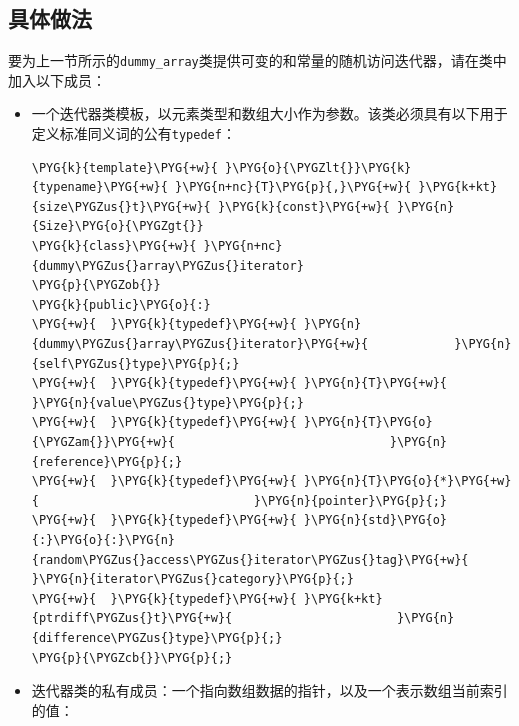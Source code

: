 
\subsection{具体做法}



要为上一节所示的\texttt{dummy\_\allowbreak{}array}类提供可变的和常量的随机访问迭代器，请在类中加入以下成员：



\begin{itemize}
\item 一个迭代器类模板，以元素类型和数组大小作为参数。该类必须具有以下用于定义标准同义词的公有\texttt{typedef}：



\begin{codeblockbg}
\begin{Verbatim}[commandchars=\\\{\},breaklines=true,breakanywhere=true,fontsize=\codefont,xleftmargin=17bp]
\PYG{k}{template}\PYG{+w}{ }\PYG{o}{\PYGZlt{}}\PYG{k}{typename}\PYG{+w}{ }\PYG{n+nc}{T}\PYG{p}{,}\PYG{+w}{ }\PYG{k+kt}{size\PYGZus{}t}\PYG{+w}{ }\PYG{k}{const}\PYG{+w}{ }\PYG{n}{Size}\PYG{o}{\PYGZgt{}}
\PYG{k}{class}\PYG{+w}{ }\PYG{n+nc}{dummy\PYGZus{}array\PYGZus{}iterator}
\PYG{p}{\PYGZob{}}
\PYG{k}{public}\PYG{o}{:}
\PYG{+w}{  }\PYG{k}{typedef}\PYG{+w}{ }\PYG{n}{dummy\PYGZus{}array\PYGZus{}iterator}\PYG{+w}{            }\PYG{n}{self\PYGZus{}type}\PYG{p}{;}
\PYG{+w}{  }\PYG{k}{typedef}\PYG{+w}{ }\PYG{n}{T}\PYG{+w}{                               }\PYG{n}{value\PYGZus{}type}\PYG{p}{;}
\PYG{+w}{  }\PYG{k}{typedef}\PYG{+w}{ }\PYG{n}{T}\PYG{o}{\PYGZam{}}\PYG{+w}{                              }\PYG{n}{reference}\PYG{p}{;}
\PYG{+w}{  }\PYG{k}{typedef}\PYG{+w}{ }\PYG{n}{T}\PYG{o}{*}\PYG{+w}{                              }\PYG{n}{pointer}\PYG{p}{;}
\PYG{+w}{  }\PYG{k}{typedef}\PYG{+w}{ }\PYG{n}{std}\PYG{o}{:}\PYG{o}{:}\PYG{n}{random\PYGZus{}access\PYGZus{}iterator\PYGZus{}tag}\PYG{+w}{ }\PYG{n}{iterator\PYGZus{}category}\PYG{p}{;}
\PYG{+w}{  }\PYG{k}{typedef}\PYG{+w}{ }\PYG{k+kt}{ptrdiff\PYGZus{}t}\PYG{+w}{                       }\PYG{n}{difference\PYGZus{}type}\PYG{p}{;}
\PYG{p}{\PYGZcb{}}\PYG{p}{;}
\end{Verbatim}
\end{codeblockbg}



\item 迭代器类的私有成员：一个指向数组数据的指针，以及一个表示数组当前索引的值：



\end{itemize}
